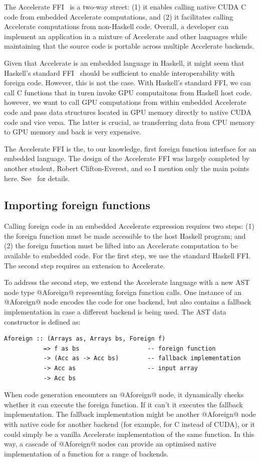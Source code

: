 The Accelerate FFI~\cite{CliftonEverest:2014vi} is a two-way street: (1) it
enables calling native CUDA C code from embedded Accelerate computations, and
(2) it facilitates calling Accelerate computations from non-Haskell code.
Overall, a developer can implement an application in a mixture of Accelerate and
other languages while maintaining that the source code is portable across
multiple Accelerate backends.

Given that Accelerate is an embedded language in Haskell, it might seem that
Haskell's standard FFI~\cite{TK} should be sufficient to enable interoperability
with foreign code. However, this is not the case. With Haskell's standard FFI,
we can call C functions that in turen invoke GPU computaitons from Haskell host
code. however, we want to call GPU computations from within embedded Accelerate
code and pass data structures located in GPU memory directly to native CUDA code
and vice versa. The latter is crucial, as transferring data from CPU memory to
GPU memory and back is very expensive.

The Accelerate FFI is the, to our knowledge, first foreign function interface
for an embedded language. The design of the Accelerate FFI was largely
completed by another student, Robert Clifton-Everest, and so I mention only the
main points here. See~\cite{CliftonEverest:2014vi} for details.

\subsection{Importing foreign functions}

Calling foreign code in an embedded Accelerate expression requires two steps:
(1) the foreign function must be made accessible to the host Haskell program;
and (2) the foreign function must be lifted into an Accelerate computation to be
available to embedded code. For the first step, we use the standard Haskell FFI.
The second step requires an extension to Accelerate.

To address the second step, we extend the Accelerate language with a new AST
node type @Aforeign@ representing foreign function calls. One instance of an
@Aforeign@ node encodes the code for one backend, but also contains a fallback
implementation in case a different backend is being used. The AST data
constructor is defined as:
%
\begin{lstlisting}[style=haskell]
  Aforeign :: (Arrays as, Arrays bs, Foreign f)
           => f as bs                   -- foreign function
           -> (Acc as -> Acc bs)        -- fallback implementation
           -> Acc as                    -- input array
           -> Acc bs
\end{lstlisting}
%
When code generation encounters an @Aforeign@ node, it dynamically checks
whether it can execute the foreign function. If it can't it executes the
fallback implementation. The fallback implementation might be another @Aforeign@
node with native code for another backend (for example, for C instead of CUDA),
or it could simply be a vanilla Accelerate implementation of the same function.
In this way, a cascade of @Aforeign@ nodes can provide an optimised native
implementation of a function for a range of backends.

